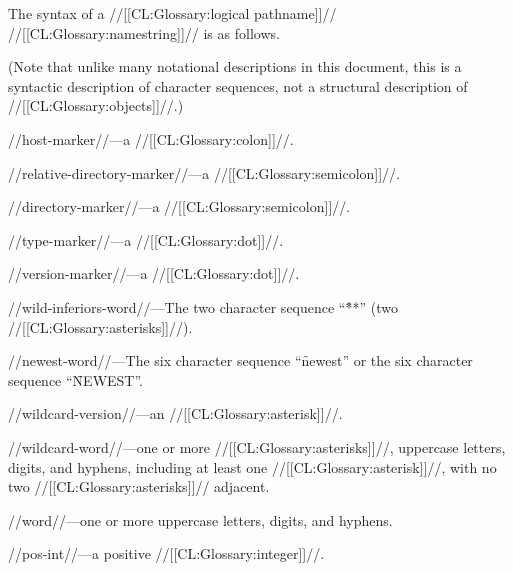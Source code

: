 


The syntax of a //[[CL:Glossary:logical pathname]]// //[[CL:Glossary:namestring]]// is as follows.

(Note that unlike many notational descriptions in this document,
 this is a syntactic description of character sequences,
 not a structural description of //[[CL:Glossary:objects]]//.)

%
{ \CR
  \CR
 }


//host-marker//---a //[[CL:Glossary:colon]]//.

//relative-directory-marker//---a //[[CL:Glossary:semicolon]]//.

//directory-marker//---a //[[CL:Glossary:semicolon]]//.

//type-marker//---a //[[CL:Glossary:dot]]//.

//version-marker//---a //[[CL:Glossary:dot]]//.

//wild-inferiors-word//---The two character sequence ``\f{**}'' (two //[[CL:Glossary:asterisks]]//).

//newest-word//---The six character sequence ``\f{newest}'' 
		   or the six character sequence ``\f{NEWEST}''.

//wildcard-version//---an //[[CL:Glossary:asterisk]]//.

//wildcard-word//---one or more //[[CL:Glossary:asterisks]]//, uppercase letters,
   digits, and hyphens, including at least one //[[CL:Glossary:asterisk]]//, 
   with no two //[[CL:Glossary:asterisks]]// adjacent.

//word//---one or more uppercase letters, digits, and hyphens.

//pos-int//---a positive //[[CL:Glossary:integer]]//.



